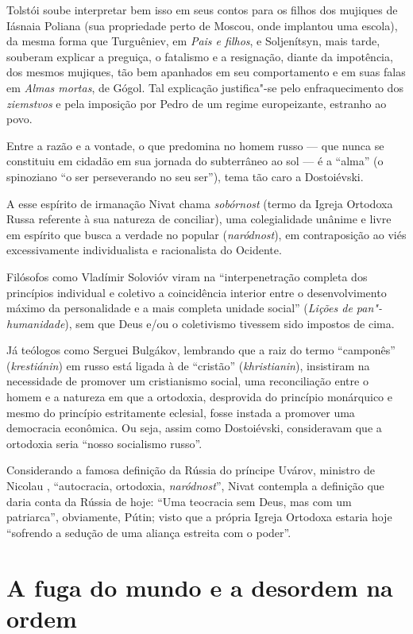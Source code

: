 Tolstói soube interpretar bem isso em seus contos para os filhos dos
mujiques de Iásnaia Poliana (sua propriedade perto de Moscou, onde
implantou uma escola), da mesma forma que Turguêniev, em \emph{Pais e
filhos}, e Soljenítsyn, mais tarde, souberam explicar a preguiça, o
fatalismo e a resignação, diante da impotência, dos mesmos mujiques, tão
bem apanhados em seu comportamento e em suas falas em \emph{Almas
mortas}, de Gógol. Tal explicação justifica"-se pelo enfraquecimento dos
\emph{ziemstvos} e pela imposição por Pedro  de um regime europeizante,
estranho ao povo.

Entre a razão e a vontade, o que predomina no homem russo --- que nunca
se constituiu em cidadão em sua jornada do subterrâneo ao sol --- é a
``alma'' (o spinoziano ``o ser perseverando no seu ser''), tema tão caro
a Dostoiévski.

A esse espírito de irmanação Nivat chama \emph{sobórnost} (termo da
Igreja Ortodoxa Russa referente à sua natureza de conciliar), uma
colegialidade unânime e livre em espírito que busca a verdade no popular
(\emph{naródnost}), em contraposição ao viés excessivamente
individualista e racionalista do Ocidente.

Filósofos como Vladímir Solovióv viram na ``interpenetração completa dos
princípios individual e coletivo a coincidência interior entre o
desenvolvimento máximo da personalidade e a mais completa unidade
social'' (\emph{Lições de pan"-humanidade}), sem que Deus e/ou o
coletivismo tivessem sido impostos de cima.

Já teólogos como Serguei Bulgákov, lembrando que a raiz do termo
``camponês'' (\emph{krestiánin}) em russo está ligada à de ``cristão''
(\emph{khristianin}), insistiram na necessidade de promover um
cristianismo social, uma reconciliação entre o homem e a natureza em que
a ortodoxia, desprovida do princípio monárquico e mesmo do princípio
estritamente eclesial, fosse instada a promover uma democracia
econômica. Ou seja, assim como Dostoiévski, consideravam que a ortodoxia
seria ``nosso socialismo russo''.

Considerando a famosa definição da Rússia do príncipe Uvárov, ministro
de Nicolau , ``autocracia, ortodoxia, \emph{naródnost}'', Nivat
contempla a definição que daria conta da Rússia de hoje: ``Uma teocracia
sem Deus, mas com um patriarca'', obviamente, Pútin; visto que a própria
Igreja Ortodoxa estaria hoje ``sofrendo a sedução de uma aliança
estreita com o poder''.

\section{A fuga do mundo e a desordem na ordem}

